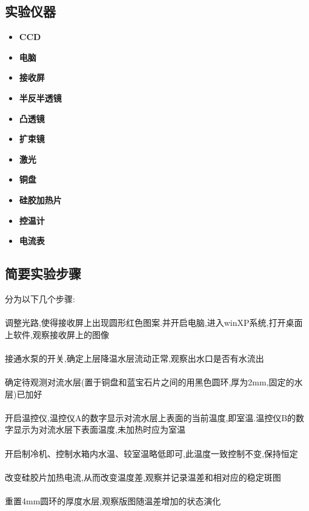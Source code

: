 \documentclass[a4paper]{article}
\begin{document}
\subsection{实验仪器}\label{sub:instruments}
\begin{itemize}
\item{\textbf{CCD}}
\item{\textbf{电脑}}
\item{\textbf{接收屏}}
\item{\textbf{半反半透镜}}
\item{\textbf{凸透镜}}
\item{\textbf{扩束镜}}
\item{\textbf{激光}}
\item{\textbf{铜盘}}
\item{\textbf{硅胶加热片}}
\item{\textbf{控温计}}
\item{\textbf{电流表}}
\end{itemize}

\subsection{简要实验步骤}\label{sub:ExperimentalSteps}
分为以下几个步骤:\\\\
调整光路,使得接收屏上出现圆形红色图案.并开启电脑,进入winXP系统,打开桌面上软件,观察接收屏上的图像\\\\
接通水泵的开关,确定上层降温水层流动正常,观察出水口是否有水流出\\\\
确定待观测对流水层(置于铜盘和蓝宝石片之间的用黑色圆环,厚为2mm,固定的水层)已加好\\\\
开启温控仪,温控仪A的数字显示对流水层上表面的当前温度,即室温.温控仪B的数字显示为对流水层下表面温度,未加热时应为室温\\\\
开启制冷机、控制水箱内水温、较室温略低即可,此温度一致控制不变,保持恒定\\\\
改变硅胶片加热电流,从而改变温度差,观察并记录温差和相对应的稳定斑图\\\\
重置4mm圆环的厚度水层,观察版图随温差增加的状态演化\\\\
\end{document}
